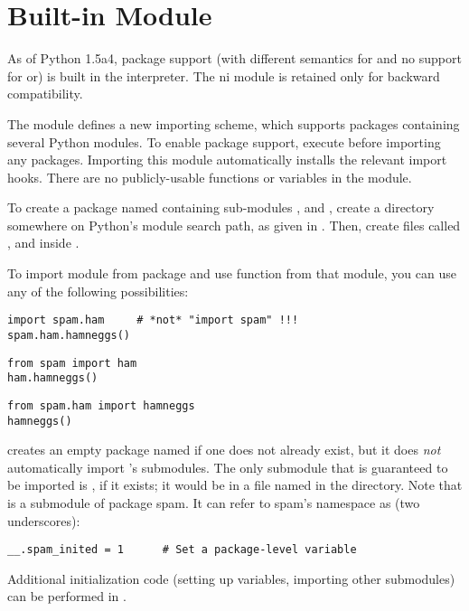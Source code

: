 \section{Built-in Module }
\label{module-ni}

  As of Python 1.5a4,
package support (with different semantics for  and no
support for  or\code{__}) is built in the
interpreter.  The ni module is retained only for backward
compatibility.

The  module defines a new importing scheme, which supports
packages containing several Python modules.  To enable package
support, execute  before importing any packages.  Importing
this module automatically installs the relevant import hooks.  There
are no publicly-usable functions or variables in the  module.

To create a package named  containing sub-modules ,  and
, create a directory  somewhere on Python's module search
path, as given in .  Then, create files called ,  and
 inside .

To import module  from package  and use function
 from that module, you can use any of the following
possibilities:

\bcode\begin{verbatim}
import spam.ham		# *not* "import spam" !!!
spam.ham.hamneggs()
\end{verbatim}\ecode
%
\bcode\begin{verbatim}
from spam import ham
ham.hamneggs()
\end{verbatim}\ecode
%
\bcode\begin{verbatim}
from spam.ham import hamneggs
hamneggs()
\end{verbatim}\ecode
%
 creates an
empty package named  if one does not already exist, but it does
\emph{not} automatically import 's submodules.  
The only submodule that is guaranteed to be imported is
, if it exists; it would be in a file named
 in the  directory.  Note that
 is a submodule of package spam.  It can refer to
spam's namespace as \code{__} (two underscores):

\bcode\begin{verbatim}
__.spam_inited = 1		# Set a package-level variable
\end{verbatim}\ecode
%
Additional initialization code (setting up variables, importing other
submodules) can be performed in .
